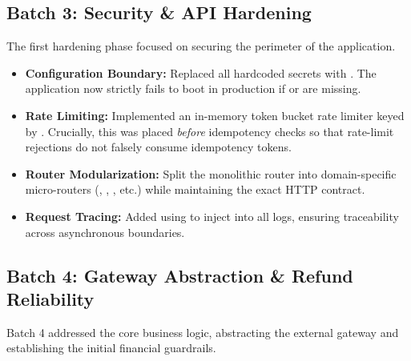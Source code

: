 \vspace{0.8cm}

\subsection{Batch 3: Security \& API Hardening}

The first hardening phase focused on securing the perimeter of the application.

\begin{tcolorbox}[batchbox={Key Implementations in Batch 3}]
\begin{itemize}
    \item \textbf{Configuration Boundary:} Replaced all hardcoded secrets with . The application now strictly fails to boot in production if  or  are missing.
    \item \textbf{Rate Limiting:} Implemented an in-memory token bucket rate limiter keyed by . Crucially, this was placed \textit{before} idempotency checks so that rate-limit rejections do not falsely consume idempotency tokens.
    \item \textbf{Router Modularization:} Split the monolithic router into domain-specific micro-routers (, , , etc.) while maintaining the exact HTTP contract.
    \item \textbf{Request Tracing:} Added  using  to inject  into all logs, ensuring traceability across asynchronous boundaries.
\end{itemize}
\end{tcolorbox}

\vspace{0.5cm}

\subsection{Batch 4: Gateway Abstraction \& Refund Reliability}

Batch 4 addressed the core business logic, abstracting the external gateway and establishing the initial financial guardrails.

